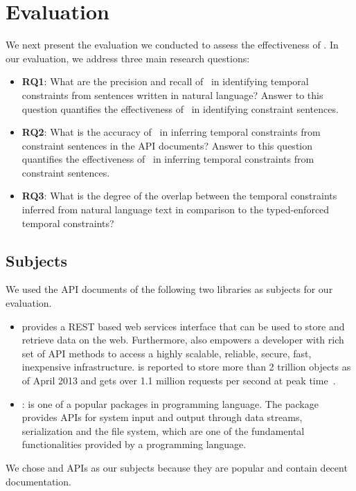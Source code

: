 \section{Evaluation}
\label{sec:evaluation}

We next present the evaluation we conducted to assess the effectiveness of \tool. In our evaluation, we address three main research questions:

\begin{itemize}
	\item\textbf{RQ1}: What are the precision and recall of \tool\ in identifying temporal constraints from sentences written in natural language?
	Answer to this question quantifies the effectiveness of \tool\ in identifying constraint sentences.
	\item\textbf{RQ2}: What is the accuracy of \tool\ in inferring temporal constraints from constraint sentences in the API documents?
	Answer to this question quantifies the effectiveness of \tool\ in inferring temporal constraints from constraint sentences. 
	\item\textbf{RQ3}: What is the degree of the overlap between the temporal constraints inferred from natural language text in comparison to the typed-enforced temporal constraints?
	
 
\end{itemize}

\subsection{Subjects}
\label{sub:subject}

We used the API documents of the following two libraries as subjects for our evaluation. 
\begin{itemize}
	\item \amazonAPI\: provides a REST based web services interface that can be used to store and retrieve data on the web. Furthermore,  also empowers a developer with rich set of API methods to access a highly scalable, reliable, secure, fast, inexpensive infrastructure.  is reported to store more than 2 trillion objects as of April 2013 and gets over 1.1 million requests per second at peak time~\cite{amazons3stats}.

	\item{} : is one of a popular packages in  programming language. The package provides APIs for system input and output through data streams, serialization and the file system, which are one of the fundamental functionalities provided by a programming language.
\end{itemize}
We chose  and  APIs as our subjects because they are popular and contain decent documentation.

